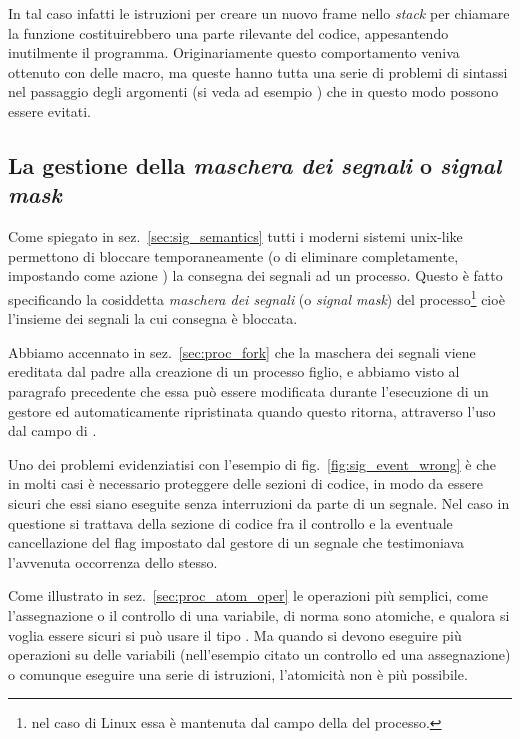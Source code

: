 In tal caso infatti le istruzioni per creare un nuovo frame nello
\textit{stack} per chiamare la funzione costituirebbero una parte rilevante
del codice, appesantendo inutilmente il programma.  Originariamente questo
comportamento veniva ottenuto con delle macro, ma queste hanno tutta una serie
di problemi di sintassi nel passaggio degli argomenti (si veda ad esempio
\cite{PratC}) che in questo modo possono essere evitati.



\subsection{La gestione della \textsl{maschera dei segnali} o 
  \textit{signal mask}}
\label{sec:sig_sigmask}


Come spiegato in sez.~\ref{sec:sig_semantics} tutti i moderni sistemi
unix-like permettono di bloccare temporaneamente (o di eliminare
completamente, impostando come azione ) la consegna dei
segnali ad un processo. Questo è fatto specificando la cosiddetta
\textsl{maschera dei segnali} (o \textit{signal mask}) del
processo\footnote{nel caso di Linux essa è mantenuta dal campo 
  della  del processo.} cioè l'insieme dei segnali la cui
consegna è bloccata.

Abbiamo accennato in sez.~\ref{sec:proc_fork} che la maschera dei segnali
viene ereditata dal padre alla creazione di un processo figlio, e abbiamo
visto al paragrafo precedente che essa può essere modificata durante
l'esecuzione di un gestore ed automaticamente ripristinata quando questo
ritorna, attraverso l'uso dal campo  di .

Uno dei problemi evidenziatisi con l'esempio di fig.~\ref{fig:sig_event_wrong}
è che in molti casi è necessario proteggere delle sezioni di codice, in modo
da essere sicuri che essi siano eseguite senza interruzioni da parte di un
segnale.  Nel caso in questione si trattava della sezione di codice fra il
controllo e la eventuale cancellazione del flag impostato dal gestore di un
segnale che testimoniava l'avvenuta occorrenza dello stesso.

Come illustrato in sez.~\ref{sec:proc_atom_oper} le operazioni più semplici,
come l'assegnazione o il controllo di una variabile, di norma sono atomiche, e
qualora si voglia essere sicuri si può usare il tipo . Ma
quando si devono eseguire più operazioni su delle variabili (nell'esempio
citato un controllo ed una assegnazione) o comunque eseguire una serie di
istruzioni, l'atomicità non è più possibile.

